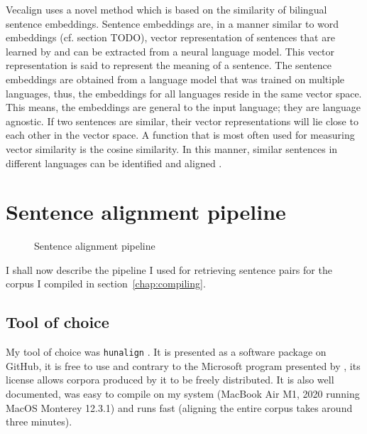 Vecalign uses a novel method which is based on the similarity of bilingual sentence embeddings. 
Sentence embeddings are, in a manner similar to word embeddings (cf. section TODO), vector representation of sentences that are learned by and can be extracted from a neural language model. 
This vector representation is said to represent the meaning of a sentence. 
The sentence embeddings are obtained from a language model that was trained on multiple languages, thus, the embeddings for all languages reside in the same vector space.
This means, the embeddings are general to the input language; they are language agnostic.
If two sentences are similar, their vector representations will lie close to each other in the vector space. 
A function that is most often used for measuring vector similarity is the cosine similarity.
In this manner, similar sentences in different languages can be identified and aligned \autocite{artexte-schwenk-2019-laser}.


\section{Sentence alignment pipeline}

\begin{figure}[h]
\centering
{}
\caption{Sentence alignment pipeline}
\end{figure}

I shall now describe the pipeline I used for retrieving sentence pairs for the corpus I compiled in section~\ref{chap:compiling}.

\subsection{Tool of choice}
\label{subsec:tool}
My tool of choice was \texttt{hunalign} \autocite{hunalign}. 
It is presented as a software package on GitHub, it is free to use and contrary to the Microsoft program presented by \cite{moore2002fast}, its license allows corpora produced by it to be freely distributed. 
It is also well documented, was easy to compile on my system (MacBook Air M1, 2020 running MacOS Monterey 12.3.1) and runs fast (aligning the entire corpus takes around three minutes). 

